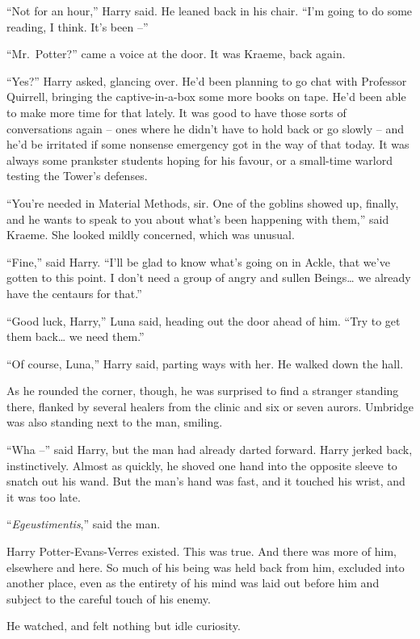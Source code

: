 ``Not for an hour,'' Harry said. He leaned back in his chair. ``I'm
going to do some reading, I think. It's been --''

``Mr.~Potter?'' came a voice at the door. It was Kraeme, back again.

``Yes?'' Harry asked, glancing over. He'd been planning to go chat with
Professor Quirrell, bringing the captive-in-a-box some more books on
tape. He'd been able to make more time for that lately. It was good to
have those sorts of conversations again -- ones where he didn't have to
hold back or go slowly -- and he'd be irritated if some nonsense
emergency got in the way of that today. It was always some prankster
students hoping for his favour, or a small-time warlord testing the
Tower's defenses.

``You're needed in Material Methods, sir. One of the goblins showed up,
finally, and he wants to speak to you about what's been happening with
them,'' said Kraeme. She looked mildly concerned, which was unusual.

``Fine,'' said Harry. ``I'll be glad to know what's going on in Ackle,
that we've gotten to this point. I don't need a group of angry and
sullen Beings\ldots{} we already have the centaurs for that.''

``Good luck, Harry,'' Luna said, heading out the door ahead of him.
``Try to get them back\ldots{} we need them.''

``Of course, Luna,'' Harry said, parting ways with her. He walked down
the hall.

As he rounded the corner, though, he was surprised to find a stranger
standing there, flanked by several healers from the clinic and six or
seven aurors. Umbridge was also standing next to the man, smiling.

``Wha --'' said Harry, but the man had already darted forward. Harry
jerked back, instinctively. Almost as quickly, he shoved one hand into
the opposite sleeve to snatch out his wand. But the man's hand was fast,
and it touched his wrist, and it was too late.

``\emph{Egeustimentis},'' said the man.

\mybreak

Harry Potter-Evans-Verres existed. This was true. And there was more of
him, elsewhere and here. So much of his being was held back from him,
excluded into another place, even as the entirety of his mind was laid
out before him and subject to the careful touch of his enemy.

He watched, and felt nothing but idle curiosity.

